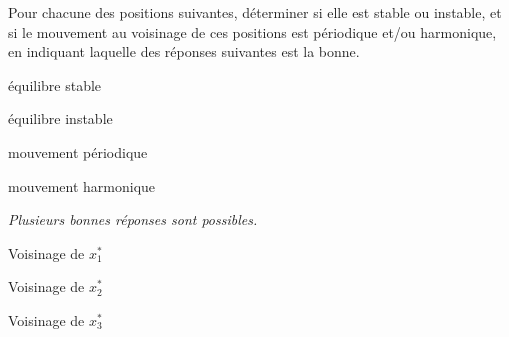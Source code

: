 Pour chacune des positions suivantes, déterminer si elle est stable ou instable, et si le mouvement au voisinage de ces positions est périodique et/ou harmonique, en indiquant laquelle des réponses suivantes est la bonne. 	\begin{listeQCM2Colonnes}
	\item équilibre stable
	\item équilibre instable
	\item mouvement périodique
	\item mouvement harmonique
\end{listeQCM2Colonnes}

\bigskip

{\itshape Plusieurs bonnes réponses sont possibles.}
\smallskip

\debutEntrainement


\begin{enonce}
	Voisinage de $x^*_1$
\end{enonce}






\begin{enonce}
	Voisinage de $x^*_2$
\end{enonce}

\reponse{\reponseB{}}




\begin{enonce}
	Voisinage de $x^*_3$
\end{enonce}




